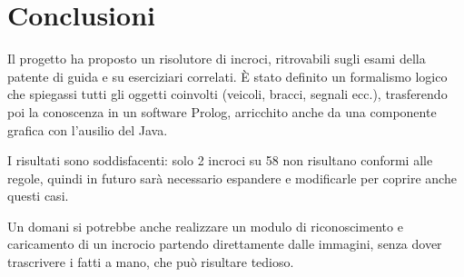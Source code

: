 \chapter{Conclusioni}

Il progetto ha proposto un risolutore di incroci, ritrovabili sugli esami della patente di guida e su eserciziari correlati. È stato definito un formalismo logico che spiegassi tutti gli oggetti coinvolti (veicoli, bracci, segnali ecc.), trasferendo poi la conoscenza in un software Prolog, arricchito anche da una componente grafica con l'ausilio del Java.

I risultati sono soddisfacenti: solo 2 incroci su 58 non risultano conformi alle regole, quindi in futuro sarà necessario espandere e modificarle per coprire anche questi casi.

Un domani si potrebbe anche realizzare un modulo di riconoscimento e caricamento di un incrocio partendo direttamente dalle immagini, senza dover trascrivere i fatti a mano, che può risultare tedioso.